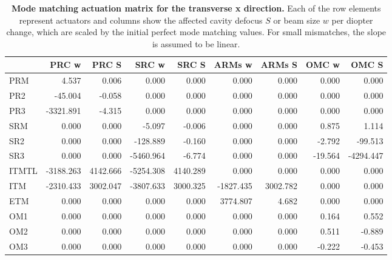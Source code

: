 \begin{table}
	\centering
\begin{tabular}{|l||r|r|r|r|r|r|r|r|}
	\hline
	 {} &     PRC w &    PRC S &     SRC w &    SRC S &    ARMs w &   ARMs S &   OMC w &     OMC S \\
	\hline
	\hline
PRM   &     4.537 &    0.006 &     0.000 &    0.000 &     0.000 &    0.000 &   0.000 &     0.000 \\
PR2   &   -45.004 &   -0.058 &     0.000 &    0.000 &     0.000 &    0.000 &   0.000 &     0.000 \\
PR3   & -3321.891 &   -4.315 &     0.000 &    0.000 &     0.000 &    0.000 &   0.000 &     0.000 \\
SRM   &     0.000 &    0.000 &    -5.097 &   -0.006 &     0.000 &    0.000 &   0.875 &     1.114 \\
SR2   &     0.000 &    0.000 &  -128.889 &   -0.160 &     0.000 &    0.000 &  -2.792 &   -99.513 \\
SR3   &     0.000 &    0.000 & -5460.964 &   -6.774 &     0.000 &    0.000 & -19.564 & -4294.447 \\
ITMTL & -3188.263 & 4142.666 & -5254.308 & 4140.289 &     0.000 & 	 0.000 &   0.000 &     0.000 \\
ITM   & -2310.433 & 3002.047 & -3807.633 & 3000.325 & -1827.435 & 3002.782 &   0.000 &     0.000 \\
ETM   &     0.000 &    0.000 &     0.000 &    0.000 &  3774.807 &    4.682 &   0.000 &     0.000 \\
OM1   &     0.000 &    0.000 &     0.000 &    0.000 &     0.000 &    0.000 &   0.164 &     0.552 \\
OM2   &     0.000 &    0.000 &     0.000 &    0.000 &     0.000 &    0.000 &   0.511 &    -0.889 \\
OM3   &     0.000 &    0.000 &     0.000 &    0.000 &     0.000 &    0.000 &  -0.222 &    -0.453 \\
	\hline
\end{tabular}
		\caption[Mode matching actuation matrix for the transverse x direction.]
	{\textbf{Mode matching actuation matrix for the transverse x direction.} Each of the row elements represent actuators and columns show the affected cavity defocus $S$ or beam size $w$ per diopter change, which are scaled by the initial perfect mode matching values.  For small mismatches, the slope is assumed to be linear.}
\label{tbl:x_act_matrix}
\end{table}

